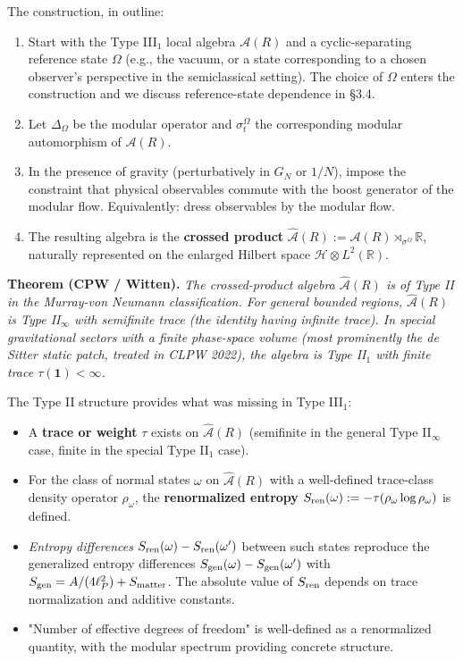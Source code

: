 \documentclass[11pt,a4paper]{article}
\begin{document}
The construction, in outline:

\begin{enumerate}
  \item Start with the Type III$_1$ local algebra $\mathcal{A}(R)$ and a cyclic-separating reference state $\Omega$ (e.g., the vacuum, or a state corresponding to a chosen observer's perspective in the semiclassical setting). The choice of $\Omega$ enters the construction and we discuss reference-state dependence in §3.4.
  \item Let $\Delta_\Omega$ be the modular operator and $\sigma_t^\Omega$ the corresponding modular automorphism of $\mathcal{A}(R)$.
  \item In the presence of gravity (perturbatively in $G_N$ or $1/N$), impose the constraint that physical observables commute with the boost generator of the modular flow. Equivalently: dress observables by the modular flow.
  \item The resulting algebra is the \textbf{crossed product} $\hat{\mathcal{A}}(R) := \mathcal{A}(R) \rtimes_{\sigma^\Omega} \mathbb{R}$, naturally represented on the enlarged Hilbert space $\mathcal{H} \otimes L^2(\mathbb{R})$.
\end{enumerate}

\textbf{Theorem (CPW / Witten).} \emph{The crossed-product algebra $\hat{\mathcal{A}}(R)$ is of Type II in the Murray-von Neumann classification. For general bounded regions, $\hat{\mathcal{A}}(R)$ is Type II$_\infty$ with semifinite trace (the identity having infinite trace). In special gravitational sectors with a finite phase-space volume (most prominently the de Sitter static patch, treated in CLPW 2022), the algebra is Type II$_1$ with finite trace $\tau(\mathbf{1}) < \infty$.}

The Type II structure provides what was missing in Type III$_1$:

\begin{itemize}
  \item A \textbf{trace or weight} $\tau$ exists on $\hat{\mathcal{A}}(R)$ (semifinite in the general Type II$_\infty$ case, finite in the special Type II$_1$ case).
  \item For the class of normal states $\omega$ on $\hat{\mathcal{A}}(R)$ with a well-defined trace-class density operator $\rho_\omega$, the \textbf{renormalized entropy} $S_{\rm ren}(\omega) := -\tau(\rho_\omega \log \rho_\omega)$ is defined.
  \item \emph{Entropy differences} $S_{\rm ren}(\omega) - S_{\rm ren}(\omega')$ between such states reproduce the generalized entropy differences $S_{\rm gen}(\omega) - S_{\rm gen}(\omega')$ with $S_{\rm gen} = A/(4\ell_P^2) + S_{\rm matter}$. The absolute value of $S_{\rm ren}$ depends on trace normalization and additive constants.
  \item "Number of effective degrees of freedom" is well-defined as a renormalized quantity, with the modular spectrum providing concrete structure.
\end{itemize}
\end{document}
